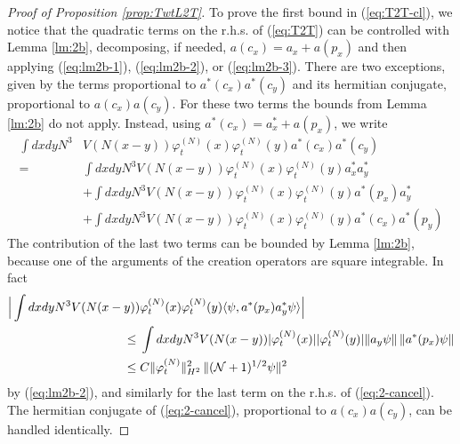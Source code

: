 \documentclass[11pt,a4paper]{article}
\newcommand{\cN}{{\cal N}}
\begin{document}
\begin{proof}[Proof of Proposition \ref{prop:TwtL2T}]
To prove the first bound in (\ref{eq:T2T-cl}), we notice that the quadratic terms on the r.h.s. of (\ref{eq:T2T}) can be controlled with Lemma \ref{lm:2b}, decomposing, if needed, $a (c_x) = a_x + a(p_x)$ and then applying (\ref{eq:lm2b-1}), (\ref{eq:lm2b-2}), or (\ref{eq:lm2b-3}). There are two exceptions, given by the terms proportional to $a^* (c_x) a^* (c_y)$ and its hermitian conjugate, proportional to $a (c_x) a(c_y)$. For these two terms the bounds from Lemma \ref{lm:2b} do not apply. Instead, using $a^* (c_x) = a^*_x + a (p_x)$, we write 
\begin{equation}\label{eq:2-cancel} \begin{split} 
\int dx dy N^3 & V(N (x-y)) \varphi_t^{(N)} (x) \varphi_t^{(N)} (y) a^* (c_x) a^* (c_y) \\ = \; &   
\int dx dy N^3 V(N (x-y)) \varphi_t^{(N)} (x) \varphi_t^{(N)} (y) a_x^* a_y^* \\ &+ 
\int dx dy N^3 V(N (x-y)) \varphi_t^{(N)} (x) \varphi_t^{(N)} (y) a^* (p_x) a_y^* \\ &+ 
\int dx dy N^3 V(N (x-y)) \varphi_t^{(N)} (x) \varphi_t^{(N)} (y) a^* (c_x) a^* (p_y) 
 \end{split} \end{equation}
The contribution of the last two terms can be bounded by Lemma \ref{lm:2b}, because one of the arguments of the creation operators are square integrable. In fact
\[ \begin{split} \Big| \int dx dy N^3 V(N (x-y)) &\varphi_t^{(N)} (x) \varphi_t^{(N)} (y)  \langle \psi , a^* (p_x) a_y^* \psi \rangle \Big| \\ \leq \; & \int dx dy N^3 V(N (x-y)) |\varphi_t^{(N)} (x)| |\varphi_t^{(N)} (y)|   \| a_y \psi \| \, \| a^* (p_x) \psi \|   \\ \leq \; & C \| \varphi_t^{(N)} \|_{H^2}^2 \, \| (\cN+1)^{1/2} \psi \|^2 
\end{split} \]
by (\ref{eq:lm2b-2}), and similarly for the last term on the r.h.s. of (\ref{eq:2-cancel}).
The hermitian conjugate of (\ref{eq:2-cancel}), proportional to $a (c_x) a (c_y)$, can be handled identically. 


\end{proof}
\end{document}
